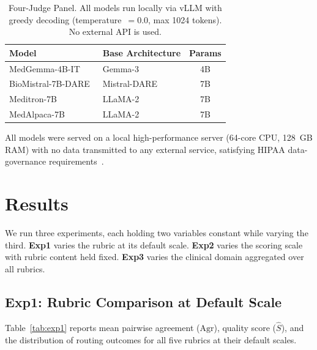 \documentclass[conference]{IEEEtran}
\begin{document}
\begin{table}[htbp]
\caption{Four-Judge Panel. All models run locally via vLLM with greedy
decoding (temperature~$=0.0$, max 1024 tokens). No external API is used.}
\label{tab:judges}
\begin{center}
\small
\begin{tabular}{|l|l|c|}
\hline
\textbf{Model} & \textbf{Base Architecture} & \textbf{Params} \\
\hline
MedGemma-4B-IT~\cite{sellergren2025medgemma}   & Gemma-3      & 4B \\
BioMistral-7B-DARE~\cite{labrak2024biomistral} & Mistral-DARE & 7B \\
Meditron-7B~\cite{chen2023meditron70b}         & LLaMA-2      & 7B \\
MedAlpaca-7B~\cite{han2023medalpaca}           & LLaMA-2      & 7B \\
\hline
\end{tabular}
\end{center}
\end{table}

All models were served on a local high-performance server (64-core CPU,
128~GB RAM) with no data transmitted to any external service, satisfying
HIPAA data-governance requirements~\cite{cohen2017hipaa}.

\section{Results}

We run three experiments, each holding two variables constant while
varying the third. \textbf{Exp1} varies the rubric at its default
scale. \textbf{Exp2} varies the scoring scale with rubric content
held fixed. \textbf{Exp3} varies the clinical domain aggregated over
all rubrics.

\subsection{Exp1: Rubric Comparison at Default Scale}

Table~\ref{tab:exp1} reports mean pairwise agreement ($\mathrm{Agr}$),
quality score ($\hat{S}$), and the distribution of routing outcomes
for all five rubrics at their default scales.
\end{document}
